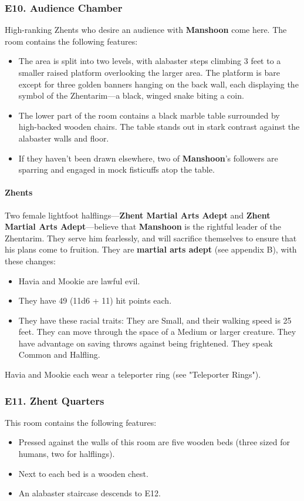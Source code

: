 \documentclass[10pt,a4paper,twoside,twocolumn,openany,nodeprecatedcode]{dndbook}
\begin{document}
\subsubsection{E10. Audience Chamber}
High-ranking Zhents who desire an audience with \textbf{Manshoon} come here. The room contains the following features:
\begin{itemize}

\item The area is split into two levels, with alabaster steps climbing 3 feet to a smaller raised platform overlooking the larger area. The platform is bare except for three golden banners hanging on the back wall, each displaying the symbol of the Zhentarim—a black, winged snake biting a coin.
\item The lower part of the room contains a black marble table surrounded by high-backed wooden chairs. The table stands out in stark contrast against the alabaster walls and floor.
\item If they haven't been drawn elsewhere, two of \textbf{Manshoon}'s followers are sparring and engaged in mock fisticuffs atop the table.
\end{itemize}


\paragraph{Zhents}
Two female lightfoot halflings—\textbf{Zhent Martial Arts Adept} and \textbf{Zhent Martial Arts Adept}—believe that \textbf{Manshoon} is the rightful leader of the Zhentarim. They serve him fearlessly, and will sacrifice themselves to ensure that his plans come to fruition. They are \textbf{martial arts adept} (see appendix B), with these changes:
\begin{itemize}

\item Havia and Mookie are lawful evil.
\item They have 49 (11d6 + 11) hit points each.
\item They have these racial traits: They are Small, and their walking speed is 25 feet. They can move through the space of a Medium or larger creature. They have advantage on saving throws against being frightened. They speak Common and Halfling.
\end{itemize}


Havia and Mookie each wear a teleporter ring (see "Teleporter Rings").
\subsubsection{E11. Zhent Quarters}
This room contains the following features:
\begin{itemize}

\item Pressed against the walls of this room are five wooden beds (three sized for humans, two for halflings).
\item Next to each bed is a wooden chest.
\item An alabaster staircase descends to E12.
\end{itemize}
\end{document}
